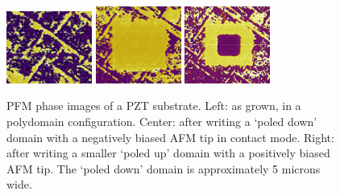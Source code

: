\documentclass[edeposit,fullpage,draftthesis]{uiucthesis2009}
\begin{document}
        \begin{figure}
        \centering
        \includegraphics[width=0.25\textwidth,height=0.225\textwidth]{images/experimentaltechniques/PFM-1.png}\hspace{0.05\textwidth}
        \includegraphics[width=0.25\textwidth]{images/experimentaltechniques/PFM-2.png}\hspace{0.05\textwidth}
        \includegraphics[width=0.25\textwidth]{images/experimentaltechniques/PFM-3.png}
        \caption[PFM micrographs of ferrelectric domains in PZT]{PFM phase images of a PZT substrate. Left: as grown, in a
                 polydomain configuration. Center: after writing a `poled down' domain
                 with a negatively biased AFM tip in contact mode. Right: after writing a
                 smaller `poled up' domain with a positively biased AFM tip. The `poled down'
                 domain is approximately 5 microns wide.}
        \label{fig:PFM_example}
        \end{figure}
        
\end{document}
